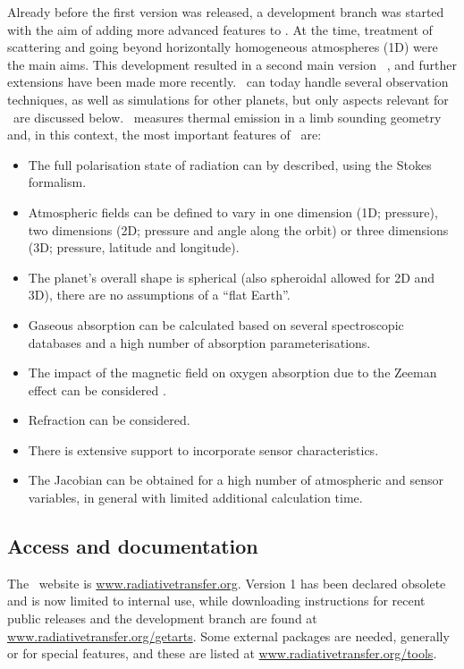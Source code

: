 Already before the first version was released, a development branch was started
with the aim of adding more advanced features to \ARTS. At the time, treatment
of scattering and going beyond horizontally homogeneous atmospheres (1D) were
the main aims. This development resulted in a second main version \ARTS\
\citep{eriksson:arts2:11}, and further extensions have been made more recently.
\ARTS\ can today handle several observation techniques, as well as simulations
for other planets, but only aspects relevant for \smr\ are discussed below.
\smr\ measures thermal emission in a limb sounding geometry and, in this
context, the most important features of \ARTS\ are:
\begin{itemize}
\item The full polarisation state of radiation can by described, using the Stokes
  formalism.
\item Atmospheric fields can be defined to vary in one dimension (1D;
  pressure), two dimensions (2D; pressure and angle along the orbit) or three
  dimensions (3D; pressure, latitude and longitude).
\item The planet's overall shape is spherical (also spheroidal allowed for 2D
  and 3D), there are no assumptions of a ``flat Earth''.
\item Gaseous absorption can be calculated based on several spectroscopic
  databases and a high number of absorption parameterisations.
\item The impact of the magnetic field on oxygen absorption due to the Zeeman
  effect can be considered \citep{larsson:zeema:14}.
\item Refraction can be considered.
\item There is extensive support to incorporate sensor characteristics.
\item The Jacobian can be obtained for a high number of atmospheric and sensor
  variables, in general with limited additional calculation time.
\end{itemize}



\subsection{Access and documentation}
%
The \ARTS\ website is \url{www.radiativetransfer.org}. Version 1
has been declared obsolete and is now limited to internal use, while downloading
instructions for recent public releases and the development branch are found
at \url{www.radiativetransfer.org/getarts}. Some external packages are needed,
generally or for special features, and these are listed at
\url{www.radiativetransfer.org/tools}.

